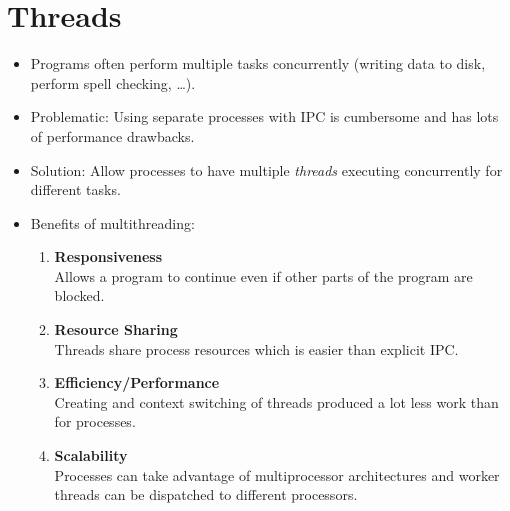 \chapter{Threads}
	\begin{itemize}
		\item Programs often perform multiple tasks concurrently (writing data to disk, perform spell checking, \dots).
		\item Problematic: Using separate processes with IPC is cumbersome and has lots of performance drawbacks.
		\item Solution: Allow processes to have multiple \textit{threads} executing concurrently for different tasks.
		\item Benefits of multithreading:
			\begin{enumerate}
				\item \textbf{Responsiveness} \\ Allows a program to continue even if other parts of the program are blocked.
				\item \textbf{Resource Sharing} \\ Threads share process resources which is easier than explicit IPC.
				\item \textbf{Efficiency/Performance} \\ Creating and context switching of threads produced a lot less work than for processes.
				\item \textbf{Scalability} \\ Processes can take advantage of multiprocessor architectures and worker threads can be dispatched to different processors.
			\end{enumerate}
	\end{itemize}

